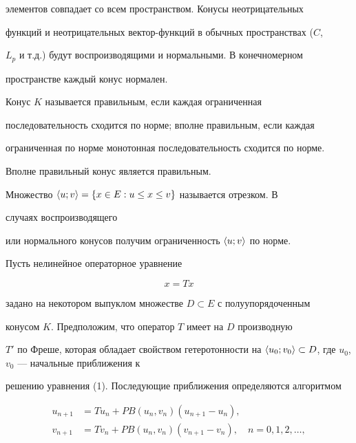 элементов совпадает со всем пространством. Конусы неотрицательных 


функций и неотрицательных вектор-функций в обычных пространствах ($C$, 


$L_p$ и т.д.) будут воспроизводящими и нормальными. В конечномерном 


пространстве каждый конус нормален. 


 


Конус $K$ называется правильным, если каждая ограниченная 


последовательность сходится по норме; вполне правильным, если каждая 


ограниченная по норме монотонная последовательность сходится по норме. 


Вполне правильный конус является правильным. 


 


Множество $\langle u;v\rangle=\{x\in E: u\le x\le v\}$ называется отрезком. В 


случаях воспроизводящего 


или нормального конусов получим ограниченность $\langle u;v\rangle$ по норме. 


 


Пусть нелинейное операторное уравнение 


\begin{equation} 


x=T x 


\end{equation} 


задано на некотором выпуклом множестве $D\subset E$ с полуупорядоченным 


конусом $K$. Предположим, что оператор $T$ имеет на $D$ производную 


$T'$ по Фреше, которая обладает свойством гетеротонности на $\la 


u_0;v_0\ra\subset D$, где $u_0$, $v_0$ --- начальные приближения к 


решению уравнения (1). Последующие приближения определяются алгоритмом 


\begin{equation} 


\begin{split} 


u_{n+1}&=T u_n+P B(u_n,v_n)(u_{n+1}-u_n),\\ 


v_{n+1}&= T v_n+P B(u_n,v_n)(v_{n+1}-v_n),\quad n=0,1,2,\dotsc, 


\end{split} 


\end{equation} 


